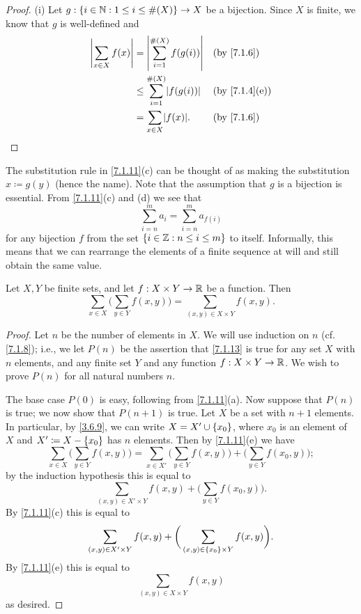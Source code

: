 \begin{proof}{(i)}
  Let \(g : \left\lbrace i \in \mathbb{N} : 1 \leq i \leq \#(X)\right\rbrace \to X\) be a bijection.
  Since \(X\) is finite, we know that \(g\) is well-defined and
  \begin{align*}
    \abs{\sum_{x \in X} f(x)} & = \abs{\sum_{i = 1}^{\#(X)} f(g(i))}    &  & \by{7.1.6}    \\
                              & \leq \sum_{i = 1}^{\#(X)} \abs{f(g(i))} &  & \by{7.1.4}[e] \\
                              & = \sum_{x \in X} \abs{f(x)}.            &  & \by{7.1.6}
  \end{align*}
\end{proof}

\begin{rmk}\label{7.1.12}
  The substitution rule in \cref{7.1.11}(c) can be thought of as making the substitution \(x \coloneqq g(y)\) (hence the name).
  Note that the assumption that \(g\) is a bijection is essential.
  From \cref{7.1.11}(c) and (d) we see that
  \[
    \sum_{i = n}^m a_i = \sum_{i = n}^m a_{f(i)}
  \]
  for any bijection \(f\) from the set \(\left\lbrace i \in \mathbb{Z} : n \leq i \leq m\right\rbrace\) to itself.
  Informally, this means that we can rearrange the elements of a finite sequence at will and still obtain the same value.
\end{rmk}

\begin{lem}\label{7.1.13}
  Let \(X, Y\) be finite sets, and let \(f : X \times Y \to \mathbb{R}\) be a function.
  Then
  \[
    \sum_{x \in X} \bigg(\sum_{y \in Y} f(x, y)\bigg) = \sum_{(x, y) \in X \times Y} f(x, y).
  \]
\end{lem}

\begin{proof}
  Let \(n\) be the number of elements in \(X\).
  We will use induction on \(n\) (cf. \cref{7.1.8});
  i.e., we let \(P(n)\) be the assertion that \cref{7.1.13} is true for any set \(X\) with \(n\) elements, and any finite set \(Y\) and any function \(f : X \times Y \to \mathbb{R}\).
  We wish to prove \(P(n)\) for all natural numbers \(n\).

  The base case \(P(0)\) is easy, following from \cref{7.1.11}(a).
  Now suppose that \(P(n)\) is true;
  we now show that \(P(n + 1)\) is true.
  Let \(X\) be a set with \(n + 1\) elements.
  In particular, by \cref{3.6.9}, we can write \(X = X' \cup \left\lbrace x_0\right\rbrace\), where \(x_0\) is an element of \(X\) and \(X' \coloneqq X - \left\lbrace x_0\right\rbrace\) has \(n\) elements.
  Then by \cref{7.1.11}(e) we have
  \[
    \sum_{x \in X} \bigg(\sum_{y \in Y} f(x, y)\bigg) = \sum_{x \in X'} \bigg(\sum_{y \in Y} f(x, y)\bigg) + \bigg(\sum_{y \in Y} f(x_0, y)\bigg);
  \]
  by the induction hypothesis this is equal to
  \[
    \sum_{(x, y) \in X' \times Y} f(x, y) + \bigg(\sum_{y \in Y} f(x_0, y)\bigg).
  \]
  By \cref{7.1.11}(c) this is equal to
  \[
    \sum_{(x, y) \in X' \times Y} f(x, y) + \bigg(\sum_{(x, y) \in \left\lbrace x_0\right\rbrace \times Y} f(x, y)\bigg).
  \]
  By \cref{7.1.11}(e) this is equal to
  \[
    \sum_{(x, y) \in X \times Y} f(x, y)
  \]
  as desired.
\end{proof}

